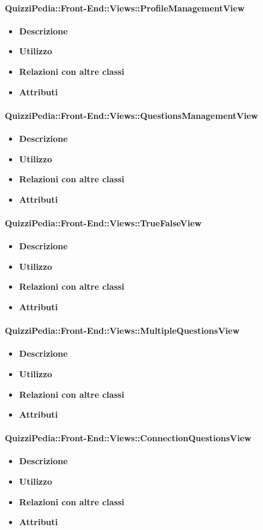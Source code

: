 \paragraph{QuizziPedia::Front-End::Views::ProfileManagementView}
\begin{itemize}
	\item \textbf{Descrizione}
	\item \textbf{Utilizzo}
	\item \textbf{Relazioni con altre classi}
	\item \textbf{Attributi}
	\end{itemize}
\paragraph{QuizziPedia::Front-End::Views::QuestionsManagementView}
\begin{itemize}
	\item \textbf{Descrizione}
	\item \textbf{Utilizzo}
	\item \textbf{Relazioni con altre classi}
	\item \textbf{Attributi}
	\end{itemize}
\paragraph{QuizziPedia::Front-End::Views::TrueFalseView}
\begin{itemize}
	\item \textbf{Descrizione}
	\item \textbf{Utilizzo}
	\item \textbf{Relazioni con altre classi}
	\item \textbf{Attributi}
	\end{itemize}
\paragraph{QuizziPedia::Front-End::Views::MultipleQuestionsView}
\begin{itemize}
	\item \textbf{Descrizione}
	\item \textbf{Utilizzo}
	\item \textbf{Relazioni con altre classi}
	\item \textbf{Attributi}
	\end{itemize}
\paragraph{QuizziPedia::Front-End::Views::ConnectionQuestionsView}
\begin{itemize}
	\item \textbf{Descrizione}
	\item \textbf{Utilizzo}
	\item \textbf{Relazioni con altre classi}
	\item \textbf{Attributi}
	\end{itemize}
